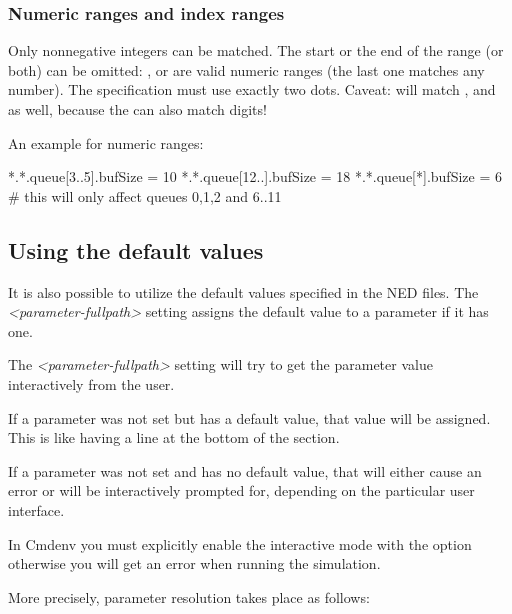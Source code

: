 \subsubsection{Numeric ranges and index ranges}

Only nonnegative integers can be matched.  The start or the end of the range
(or both) can be omitted: ,  or 
are valid numeric ranges (the last one matches any number).
The specification must use exactly two dots.
Caveat:  will match ,  and  as well,
because the \ttt{*} can also match digits!

An example for numeric ranges:

\begin{inifile}
[General]
*.*.queue[3..5].bufSize = 10
*.*.queue[12..].bufSize = 18
*.*.queue[*].bufSize = 6  # this will only affect queues 0,1,2 and 6..11
\end{inifile}


\subsection{Using the default values}

It is also possible to utilize the default values specified in the NED files.
The \textit{<parameter-fullpath>} setting assigns
the default value to a parameter if it has one.

The \textit{<parameter-fullpath>} setting will try to get the parameter
value interactively from the user.

If a parameter was not set but has a default value, that value will be
assigned. This is like having a  line at the
bottom of the \ttt{[General]} section.

If a parameter was not set and has no default value, that will either
cause an error or will be interactively prompted for, depending
on the particular user interface.

\begin{note}
In Cmdenv you must explicitly enable the interactive mode with the
 option otherwise you will get an error
when running the simulation.
\end{note}

More precisely, parameter resolution takes place as follows:

